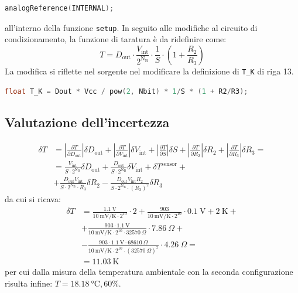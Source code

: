 \documentclass{article}
\begin{document}
\lstset{style=mystyle}

\begin{lstlisting}[language=C]
    analogReference(INTERNAL); 
\end{lstlisting}    
all'interno della funzione \texttt{setup}.
In seguito alle modifiche al circuito di condizionamento, la funzione di taratura è da ridefinire come:
\begin{equation*}
    T=D_{\text{out}}\cdot\frac{V_{\text{int}}}{2^{\text{N}_\text{B}}}\cdot\frac{1}{S}\cdot\left(1+\frac{R_2}{R_3}\right)
\end{equation*}
La modifica si riflette nel sorgente nel modificare la definizione di \texttt{T\_K} di riga 13.
\begin{lstlisting}[language=C]
    float T_K = Dout * Vcc / pow(2, Nbit) * 1/S * (1 + R2/R3);
\end{lstlisting}    
\subsection{Valutazione dell'incertezza}
\begin{equation*}
    \begin{split}    
        \delta T&=\left|\frac{\partial T}{\partial D_{\text{out}}}\right|\delta D_{\text{out}}+\left|\frac{\partial T}{\partial V_{\text{int}}}\right|\delta V_{\text{int}}+\left|\frac{\partial T}{\partial S}\right|\delta S+\left|\frac{\partial T}{\partial R_2}\right|\delta R_2+\left|\frac{\partial T}{\partial R_3}\right|\delta R_3 =\\
        &=\frac{V_{\text{int}}}{S\cdot2^{\text{N}_\text{B}}}\delta D_{\text{out}}+\frac{D_{\text{out}}}{S\cdot2^{\text{N}_\text{B}}}\delta V_{\text{int}}+\delta T^{\text{sensor}}+\\
        &+\frac{D_{\text{out}}V_{\text{int}}}{S\cdot2^{\text{N}_\text{B}}\cdot R_3}\delta R_2-\frac{D_{\text{out}}V_{\text{int}}R_2}{S\cdot2^{\text{N}_\text{B}}\cdot {\left(R_3\right)}^2}\delta R_3
    \end{split}    
\end{equation*}
da cui si ricava:
\begin{equation*}
    \begin{split}
        \delta T&=\frac{\SI{1.1}\volt}{\SI{10}{\milli\volt\per\kelvin}\cdot2^{10}}\cdot 2+\frac{903}{\SI{10}{\milli\volt\per\kelvin}\cdot 2^{10}}\cdot\SI{0.1}{\volt}+\SI{2}{\kelvin}+\\
        &+\frac{903\cdot\SI{1.1}{\volt}}{\SI{10}{\milli\volt\per\kelvin}\cdot 2^{10}\cdot \SI{32570}{\Omega}}\cdot\SI{7.86}{\Omega}+\\
        &- \frac{903\cdot\SI{1.1}{\volt}\cdot\SI{68610}{\Omega}}{\SI{10}{\milli\volt\per\kelvin}\cdot 2^{10}\cdot{\left(\SI{32570}{\Omega}\right)}^2}\cdot\SI{4.26}{\Omega}=\\
        &=\SI{11.03}{\kelvin}
    \end{split}
\end{equation*}
per cui dalla misura della temperatura ambientale con la seconda configurazione risulta infine: $T = \SI{18.18}{\celsius}, 60\%$.
\end{document}
